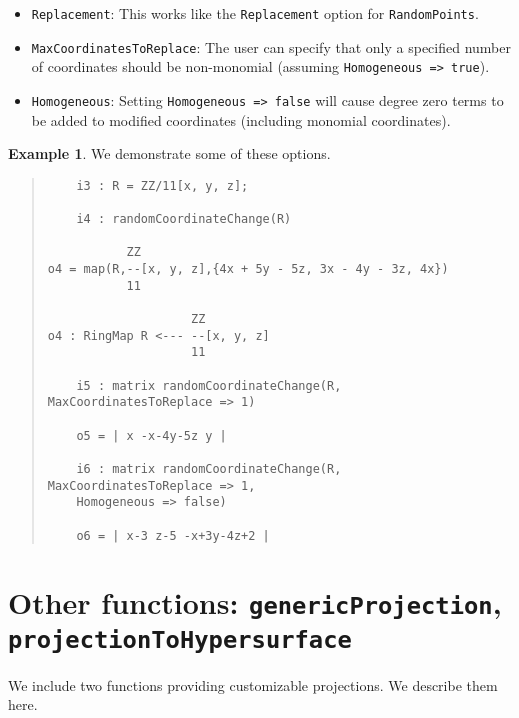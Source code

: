 \documentclass[11pt]{amsart}
\theoremstyle{definition}
\newtheorem{example}{Example}[section]
\begin{document}
\begin{itemize}
\item {\tt Replacement}: This works like the {\tt Replacement} option for {\tt RandomPoints}.
\item {\tt MaxCoordinatesToReplace}: The user can specify that only a specified number of coordinates should be non-monomial (assuming {\tt Homogeneous => true}).  
\item {\tt Homogeneous}:  Setting {\tt Homogeneous => false} will cause degree zero terms to be added to modified coordinates (including monomial coordinates).		
\end{itemize} 
\begin{example}  We demonstrate some of these options.
%
  {{\small\color{blue}
  \begin{quote}
\begin{verbatim}
	i3 : R = ZZ/11[x, y, z];
	
	i4 : randomCoordinateChange(R)
	
           ZZ
o4 = map(R,--[x, y, z],{4x + 5y - 5z, 3x - 4y - 3z, 4x})                     
           11
           
                    ZZ
o4 : RingMap R <--- --[x, y, z]
                    11
                    
	i5 : matrix randomCoordinateChange(R, MaxCoordinatesToReplace => 1)
	
	o5 = | x -x-4y-5z y |
	
	i6 : matrix randomCoordinateChange(R, MaxCoordinatesToReplace => 1, 
	Homogeneous => false)
	
	o6 = | x-3 z-5 -x+3y-4z+2 |
\end{verbatim}
\end{quote}
    }}
  
\end{example}


\section{Other functions: {\tt genericProjection}, {\tt projectionToHypersurface}}\label{projectionfunctions}

We include two functions providing customizable projections. We describe them here. 

\end{document}
